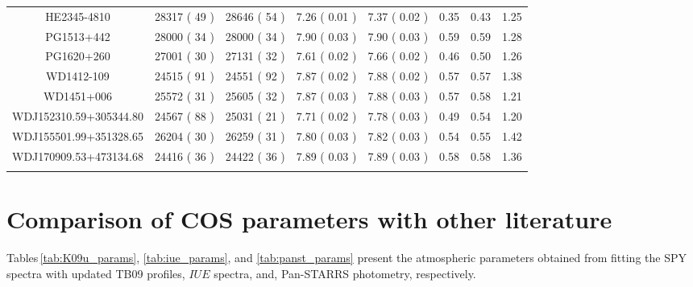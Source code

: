 \documentclass[fleqn,usenatbib, useAMS]{mnras}
\begin{document}
\begin{table*}
\begin{tabular}{cccccccc}
HE2345-4810	&	28317	(	49 	)	&	28646	(	54	)	&	7.26	(	0.01	)	&	7.37	(	0.02	)	&	0.35	&	0.43	&	1.25	\\
PG1513+442	&	28000	(	34 	)	&	28000	(	34	)	&	7.90	(	0.03	)	&	7.90	(	0.03	)	&	0.59	&	0.59	&	1.28	\\
PG1620+260	&	27001	(	30 	)	&	27131	(	32	)	&	7.61	(	0.02	)	&	7.66	(	0.02	)	&	0.46	&	0.50	&	1.26	\\
WD1412-109	&	24515	(	91 	)	&	24551	(	92	)	&	7.87	(	0.02	)	&	7.88	(	0.02	)	&	0.57	&	0.57	&	1.38	\\
WD1451+006	&	25572	(	31 	)	&	25605	(	32	)	&	7.87	(	0.03	)	&	7.88	(	0.03	)	&	0.57	&	0.58	&	1.21	\\
WDJ152310.59+305344.80	&	24567	(	88 	)	&	25031	(	21	)	&	7.71	(	0.02	)	&	7.78	(	0.03	)	&	0.49	&	0.54	&	1.20	\\
WDJ155501.99+351328.65	&	26204	(	30 	)	&	26259	(	31	)	&	7.80	(	0.03	)	&	7.82	(	0.03	)	&	0.54	&	0.55	&	1.42	\\
WDJ170909.53+473134.68	&	24416	(	36 	)	&	24422	(	36	)	&	7.89	(	0.03	)	&	7.89	(	0.03	)	&	0.58	&	0.58	&	1.36	\\
 \hline
\label{tab:params_wd_withism_lyman}
\end{tabular}
\end{table*}

\section{Comparison of COS parameters with other literature}
Tables\,\ref{tab:K09u_params}, \ref{tab:iue_params}, and \ref{tab:panst_params} present the atmospheric parameters obtained from fitting the  SPY spectra \citep{Koester2009} with updated TB09 profiles, $IUE$ spectra, and, Pan-STARRS photometry, respectively.
\end{document}
